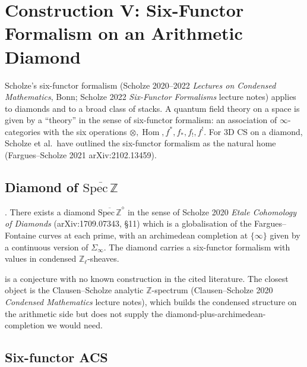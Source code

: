 \section{Construction V: Six-Functor Formalism on an Arithmetic Diamond}
\label{v4-arith:w10-a:construction-V}

Scholze's six-functor formalism (Scholze 2020--2022
\emph{Lectures on Condensed Mathematics}, Bonn; Scholze 2022
\emph{Six-Functor Formalisms} lecture notes) applies to diamonds and
to a broad class of stacks. A quantum field theory on a space is
given by a ``theory'' in the sense of six-functor formalism:
an association of \(\infty\)-categories with the six operations
\(\otimes,\operatorname{Hom},f^{*},f_{*},f_{!},f^{!}\). For 3D
CS on a diamond, Scholze et al.\ have outlined the six-functor
formalism as the natural home (Fargues--Scholze 2021
arXiv:2102.13459).

\subsection{Diamond of \texorpdfstring{\(\overline{\mathrm{Spec}\,\mathbb Z}\)}{Spec Z bar}}
\label{v4-arith:w10-a:diamond}

\begin{conjecture}
\label{v4-arith:w10-a:conj:arith-diamond}
\ClaimStatusConjectured. There exists a diamond
\(\overline{\mathrm{Spec}\,\mathbb Z}^{\diamond}\) in the sense of
Scholze 2020 \emph{Etale Cohomology of Diamonds}
(arXiv:1709.07343, \S11) which is a globalisation of the
Fargues--Fontaine curves at each prime, with an archimedean
completion at \(\{\infty\}\) given by a continuous version of
\(\Sigma_{\infty}\). The diamond carries a six-functor formalism
with values in condensed \(\mathbb{Z}_{\ell}\)-sheaves.
\end{conjecture}

\begin{remark}
\label{v4-arith:w10-a:rem:diamond-form}
 is a conjecture with no
known construction in the cited literature. The closest object is the
Clausen--Scholze analytic \(\mathbb{Z}\)-spectrum
(Clausen--Scholze 2020 \emph{Condensed Mathematics} lecture notes),
which builds the condensed structure on the arithmetic side but does
not supply the diamond-plus-archimedean-completion we would need.
\end{remark}

\subsection{Six-functor ACS}
\label{v4-arith:w10-a:six-fun-ACS}

